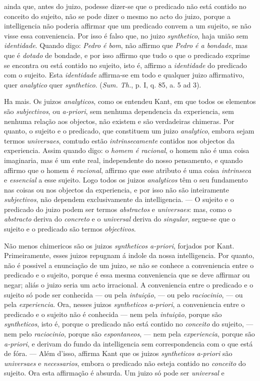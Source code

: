ainda que, antes do juizo, podesse dizer-se que o predicado não está contido no conceito do sujeito, não se pode dizer o mesmo no acto do juizo, porque a intelligencia não poderia affirmar que um predicado convem a um sujeito, se não visse essa conveniencia. Por isso é falso que, no juizo \emph{synthetico}, haja união sem \emph{identidade}. Quando digo: \emph{Pedro é bom}, não affirmo que \emph{Pedro é a bondade}, mas que é \emph{dotado} de bondade, e por isso affirmo que tudo o que o predicado exprime se encontra ou está contido no sujeito, isto é, affirmo a \emph{identidade} do predicado com o sujeito. Esta \emph{identidade} affirma-se em todo e qualquer juizo affirmativo, quer \emph{analytico} quer \emph{synthetico}. (\emph{Sum. Th.}, p. I, q. 85, a. 5 ad 3).\par Ha mais. Os juizos \emph{analyticos}, como os entendeu Kant, em que todos os elementos são \emph{subjectivos}, ou \emph{a-priori}, sem nenhuma dependencia da experiencia, sem nenhuma relação aos objectos, não existem e são verdadeiras chimeras. Por quanto, o sujeito e o predicado, que constituem um juizo \emph{analytico}, embora sejam termos \emph{universaes}, comtudo estão \emph{intrinsecamente} contidos nos objectos da experiencia. Assim quando digo: o \emph{homem é racional}, o homem não é uma coisa imaginaria, mas é um ente real, independente do nosso pensamento, e quando affirmo que o homem é \emph{racional}, affirmo que esse atributo é uma coisa \emph{intrinseca} e \emph{essencial} a esse sujeito. Logo todos os juizos \emph{analyticos} têm o seu fundamento nas coisas ou nos objectos da experiencia, e por isso não são inteiramente \emph{subjectivos}, não dependem exclusivamente da intelligencia. --- O sujeito e o predicado do juizo podem ser termos \emph{abstractos} e \emph{universaes}: mas, como o \emph{abstracto} deriva do \emph{concreto} e o \emph{universal} deriva do \emph{singular}, segue-se que o sujeito e o predicado são termos \emph{objectivos}.\par Não menos chimericos são os juizos \emph{syntheticos a-priori}, forjados por Kant. Primeiramente, esses juizos repugnam á indole da nossa intelligencia. Por quanto, não é possivel a enunciação de um juizo, se não se conhece a conveniencia entre o predicado e o sujeito, porque é essa mesma conveniencia que se deve affirmar ou negar; aliás o juizo seria um acto irracional. A conveniencia entre o predicado e o sujeito só pode ser conhecida --- ou pela \emph{intuição}, --- ou pelo \emph{raciocinio}, --- ou pela \emph{experiencia}. Ora, nesses juizos \emph{syntheticos a-priori}, a conveniencia entre o predicado e o sujeito não é conhecida --- nem pela \emph{intuição}, porque são \emph{syntheticos}, isto é, porque o predicado não está contido no \emph{conceito} do sujeito, --- nem pelo \emph{raciocinio}, porque são \emph{espontaneos}, --- nem pela \emph{experiencia}, porque são \emph{a-priori}, e derivam do fundo da intelligencia sem correspondencia com o que está de fóra. --- Além d'isso, affirma Kant que os juizos \emph{syntheticos a-priori} são \emph{universaes} e \emph{necessarios}, embora o predicado não esteja contido no \emph{conceito} do sujeito. Ora esta affirmação é absurda. Um juizo só pode ser \emph{universal} e 